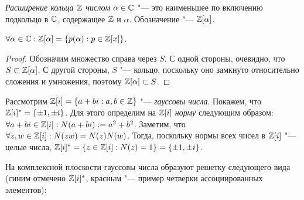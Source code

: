 \begin{definition}
	\textit{Расширение кольца $\mathbb{Z}$ числом $\alpha \in \mathbb{C}$} "--- это наименьшее по включению подкольцо в $\mathbb{C}$, содержащее $\mathbb{Z}$ и $\alpha$. Обозначение "--- $\mathbb{Z}[\alpha]$.
\end{definition}

\begin{proposition}
	$\forall \alpha \in \mathbb{C}: \mathbb{Z}[\alpha] = \{p(\alpha): p \in \mathbb{Z}[x]\}$.
\end{proposition}

\begin{proof}
	Обозначим множество справа через $S$. С одной стороны, очевидно, что $S \subset \mathbb{Z}[\alpha]$. С другой стороны, $S$ "--- кольцо, поскольку оно замкнуто относительно сложения и умножения, поэтому $\mathbb{Z}[\alpha] \subset S$.
\end{proof}

\begin{example}
	Рассмотрим $\mathbb{Z}[i] = \{a + bi: a, b \in \mathbb{Z}\}$ "--- \textit{гауссовы числа}. Покажем, что $\Z[i]^* \hm= \{\pm1, \pm i\}$. Для этого определим на $\mathbb{Z}[i]$ \textit{норму} следующим образом: $\forall a + bi \in \mathbb{Z}[i]: N(a + bi) := a^2 + b^2$. Заметим, что $\forall z, w \in \mathbb{Z}[i]: N(zw) = N(z)N(w)$. Тогда, поскольку нормы всех чисел в $\mathbb{Z}[i]$ "--- целые числа, $\mathbb{Z}[i]^* = \{z \in \mathbb{Z}[i]: N(z) = 1\} = \{\pm1, \pm i\}$.
	
	\pagebreak
	На комплексной плоскости гауссовы числа образуют решетку следующего вида (синим отмечено $\mathbb{Z}[i]^*$, красным "--- пример четверки ассоциированных элементов):
	\begin{center}
	\end{center}
\end{example}

